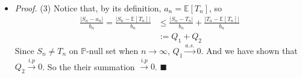 \documentclass[a4paper,12pt,twoside]{book}
\begin{document}
\begin{itemize}
	\item[]\textit{Proof.} (3) Notice that, by its definition, $a_n = \mathbb{E}\left[T_n\right]$, so
	\begin{equation}
		\begin{split}
			\frac{|S_n- a_n|}{b_n}=\frac{|S_n- \mathbb{E}\left[T_n\right]|}{b_n}&\leq \frac{|S_n-T_n|}{b_n}+\frac{|T_n- \mathbb{E}\left[T_n\right]|}{b_n}\\
			&:=Q_1 + Q_2
		\end{split}
	\end{equation}
	Since $S_n \ne T_n$ on $\mathbb{P}$-null set when $n\to \infty$, $Q_1 \xrightarrow{a.s.} 0$. And we have shown that $Q_2 \xrightarrow{i.p} 0$. So the their summation $\xrightarrow{i.p}0$. $\blacksquare$
\end{itemize}
\end{document}
